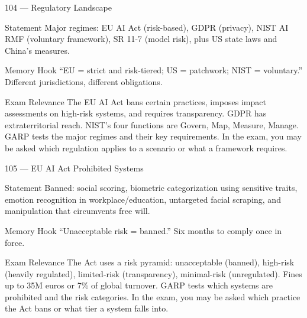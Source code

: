\documentclass[aspectratio=169,8pt]{beamer}
\begin{document}
	\begin{frame}{104 --- Regulatory Landscape}
		\begin{block}{Statement}
			Major regimes: EU AI Act (risk-based), GDPR (privacy), NIST AI RMF (voluntary framework), SR 11-7 (model risk), plus US state laws and China's measures.
		\end{block}
		\begin{block}{Memory Hook}
			``EU = strict and risk-tiered; US = patchwork; NIST = voluntary.'' Different jurisdictions, different obligations.
		\end{block}
		\begin{block}{Exam Relevance}
			The EU AI Act bans certain practices, imposes impact assessments on high-risk systems, and requires transparency. GDPR has extraterritorial reach. NIST's four functions are Govern, Map, Measure, Manage. GARP tests the major regimes and their key requirements. In the exam, you may be asked which regulation applies to a scenario or what a framework requires.
		\end{block}
	\end{frame}
	
	\begin{frame}{105 --- EU AI Act Prohibited Systems}
		\begin{block}{Statement}
			Banned: social scoring, biometric categorization using sensitive traits, emotion recognition in workplace/education, untargeted facial scraping, and manipulation that circumvents free will.
		\end{block}
		\begin{block}{Memory Hook}
			``Unacceptable risk = banned.'' Six months to comply once in force.
		\end{block}
		\begin{block}{Exam Relevance}
			The Act uses a risk pyramid: unacceptable (banned), high-risk (heavily regulated), limited-risk (transparency), minimal-risk (unregulated). Fines up to 35M euros or 7\% of global turnover. GARP tests which systems are prohibited and the risk categories. In the exam, you may be asked which practice the Act bans or what tier a system falls into.
		\end{block}
	\end{frame}
	
\end{document}
